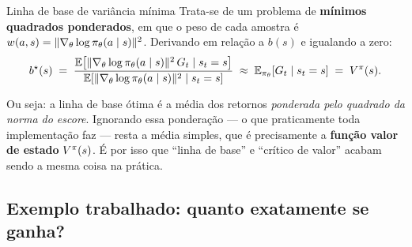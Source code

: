 \documentclass[11pt, a4paper]{article}
\begin{document}
\begin{teobox}{Linha de base de variância mínima}
Trata-se de um problema de \textbf{mínimos quadrados ponderados}, em que o peso
de cada amostra é $w(a,s) = \|\nabla_\theta \log \pi_\theta(a\mid s)\|^2$. Derivando em relação a $b(s)$ e
igualando a zero:
\[
  b^\star(s) \;=\;
  \frac{\mathbb{E}\!\left[\|\nabla_\theta \log \pi_\theta(a\mid s)\|^2\, G_t \mid s_t = s\right]}
       {\mathbb{E}\!\left[\|\nabla_\theta \log \pi_\theta(a\mid s)\|^2 \mid s_t = s\right]}
  \;\approx\; \mathbb{E}_{\pi_\theta}\!\left[G_t \mid s_t = s\right] \;=\; V^{\pi}(s).
\]
\end{teobox}

Ou seja: a linha de base ótima é a média dos retornos \emph{ponderada pelo
quadrado da norma do escore}. Ignorando essa ponderação --- o que praticamente
toda implementação faz --- resta a média simples, que é precisamente a
\textbf{função valor de estado} $V^{\pi}(s)$. É por isso que ``linha de base'' e
``crítico de valor'' acabam sendo a mesma coisa na prática.

\subsection{Exemplo trabalhado: quanto exatamente se ganha?}
\end{document}
